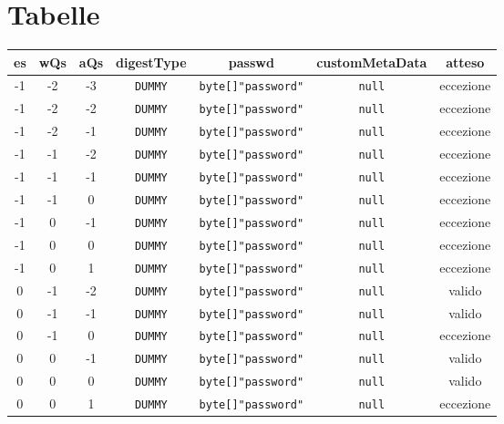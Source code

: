 \documentclass[10pt]{article}
\begin{document}
{		\section{Tabelle}
		\begin{table}[h]
			\centering
			\begin{tabular}{|c|c|c|c|c|c|c|}
				\hline
				\textbf{es} & \textbf{wQs} & \textbf{aQs} & \textbf{digestType} & \textbf{passwd} & \textbf{customMetaData} & \textbf{atteso} \\
				\hline
				-1 & -2 & -3 & \texttt{DUMMY} & \texttt{byte[]{"password"}} & \texttt{null} & eccezione \\
				\hline
				-1 & -2 & -2 & \texttt{DUMMY} & \texttt{byte[]{"password"}} & \texttt{null} & eccezione \\
				\hline
				-1 & -2 & -1 & \texttt{DUMMY} & \texttt{byte[]{"password"}} & \texttt{null} & eccezione \\
				\hline
				-1 & -1 & -2 & \texttt{DUMMY} & \texttt{byte[]{"password"}} & \texttt{null} & eccezione \\
				\hline
				-1 & -1 & -1 & \texttt{DUMMY} & \texttt{byte[]{"password"}} & \texttt{null} & eccezione \\
				\hline
				-1 & -1 & 0 & \texttt{DUMMY} & \texttt{byte[]{"password"}} & \texttt{null} & eccezione \\
				\hline
				-1 & 0 & -1 & \texttt{DUMMY} & \texttt{byte[]{"password"}} & \texttt{null} & eccezione \\
				\hline
				-1 & 0 & 0 & \texttt{DUMMY} & \texttt{byte[]{"password"}} & \texttt{null} & eccezione \\
				\hline
				-1 & 0 & 1 & \texttt{DUMMY} & \texttt{byte[]{"password"}} & \texttt{null} & eccezione \\
				\hline
				0 & -1 & -2 & \texttt{DUMMY} & \texttt{byte[]{"password"}} & \texttt{null} & valido \\
				\hline
				0 & -1 & -1 & \texttt{DUMMY} & \texttt{byte[]{"password"}} & \texttt{null} & valido \\
				\hline
				0 & -1 & 0 & \texttt{DUMMY} & \texttt{byte[]{"password"}} & \texttt{null} & eccezione \\
				\hline
				0 & 0 & -1 & \texttt{DUMMY} & \texttt{byte[]{"password"}} & \texttt{null} & valido \\
				\hline
				0 & 0 & 0 & \texttt{DUMMY} & \texttt{byte[]{"password"}} & \texttt{null} & valido \\
				\hline
				0 & 0 & 1 & \texttt{DUMMY} & \texttt{byte[]{"password"}} & \texttt{null} & eccezione \\

\end{tabular}
\end{table}}
\end{document}
